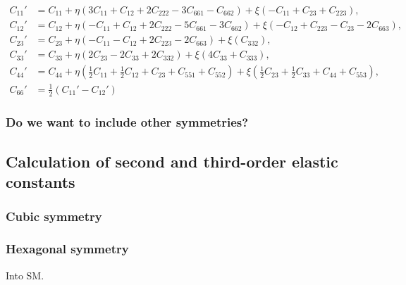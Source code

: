 \documentclass[showpacs,aps,floatfix,prb,reprint,superscriptaddress]{revtex4-1}
\begin{document}
 \begin{widetext}
\begin{subequations}
\label{eqn:Cprime_hexagonal} 
\begin{align}
        C_{11}' &=C_{11} + \eta \left(3C_{11} + C_{12} + 2C_{222} - 3C_{661} - C_{662}\right) + \xi \left(-C_{11} + C_{23} + C_{223}\right),\\
        C_{12}' &=C_{12} + \eta \left(-C_{11} + C_{12} + 2C_{222} -5C_{661} - 3C_{662}\right) + \xi \left(-C_{12} + C_{223} - C_{23} - 2C_{663}\right),\\
				C_{23}' &=C_{23} + \eta \left(-C_{11}-C_{12}+2C_{223}-2C_{663} \right) + \xi \left(C_{332}\right),\\
				C_{33}' &=C_{33} + \eta \left(2C_{23}-2C_{33}+2C_{332} \right) + \xi \left(4C_{33}+C_{333}\right),\\
				C_{44}' &=C_{44} + \eta \left(\frac{1}{2} C_{11} + \frac{1}{2} C_{12} + C_{23} + C_{551} + C_{552} \right) + \xi \left(\frac{1}{2} C_{23} + \frac{1}{2} C_{33} + C_{44} + C_{553}\right),\\
				C_{66}' &=\frac{1}{2} \left(C_{11}'-C_{12}'\right)
\end{align}
\end{subequations}
\end{widetext} 










\subsubsection{Do we want to include other symmetries?}

\subsection{Calculation of second and third-order elastic constants}

\subsubsection{Cubic symmetry}


\subsubsection{Hexagonal symmetry}

Into SM.
%
%
\end{document}
